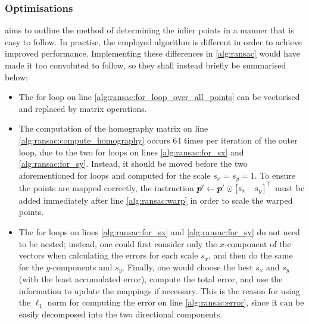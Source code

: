 \documentclass[../report.tex]{subfiles}
\begin{document}
\subsubsection{Optimisations}
 aims to outline the method of determining the inlier points in a manner that is easy to follow.
In practise, the employed algorithm is different in order to achieve improved performance.
Implementing these differences in \cref{alg:ransac} would have made it too convoluted to follow, so they shall instead briefly be summarised below:
\begin{itemize}
    \item The for loop on line \ref{alg:ransac:for_loop_over_all_points} can be vectorised and replaced by matrix operations.
    \item The computation of the homography matrix on line \ref{alg:ransac:compute_homography} occurs 64 times per iteration of the outer loop, due to the two for loops on lines \ref{alg:ransac:for_sx} and \ref{alg:ransac:for_sy}.
        Instead, it should be moved before the two aforementioned for loops and computed for the scale $s_x=s_y=1$.
        To ensure the points are mapped correctly, the instruction ${\bm{p}}' \gets {\bm{p}}' \odot \begin{bmatrix}
            s_x & s_y
        \end{bmatrix}^\top$ must be added immediately after line \ref{alg:ransac:warp} in order to scale the warped points.
    \item The for loops on lines \ref{alg:ransac:for_sx} and \ref{alg:ransac:for_sy} do not need to be nested; instead, one could first consider only the $x$-component of the vectors when calculating the errors for each scale $s_x$, and then do the same for the $y$-components and $s_y$.
        Finally, one would choose the best $s_x$ and $s_y$ (with the least accumulated error), compute the total error, and use the information to update the mappings if necessary.
        This is the reason for using the $\ell_1$ norm for computing the error on line \ref{alg:ransac:error}, since it can be easily decomposed into the two directional components.
\end{itemize}
\end{document}
